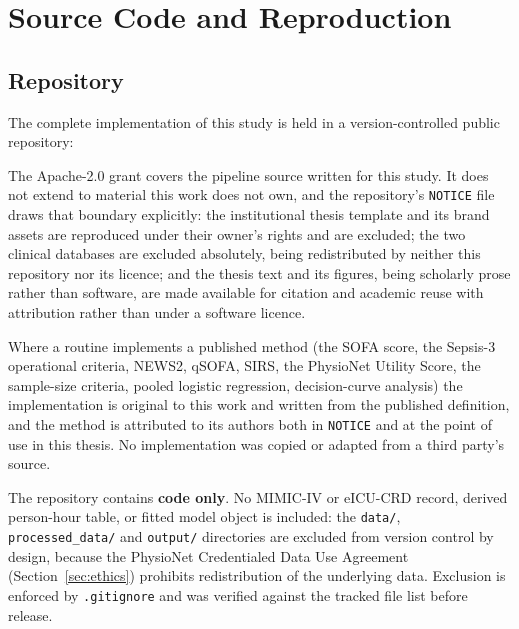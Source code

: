 \chapter{Source Code and Reproduction}
\label{app:code}

\section{Repository}
\label{app:repo}

The complete implementation of this study is held in a version-controlled
public repository:

\begin{center}
\end{center}

The Apache-2.0 grant covers the pipeline source written for this study. It does
not extend to material this work does not own, and the repository's
\texttt{NOTICE} file draws that boundary explicitly: the institutional thesis
template and its brand assets are reproduced under their owner's rights and are
excluded; the two clinical databases are excluded absolutely, being redistributed
by neither this repository nor its licence; and the thesis text and its figures,
being scholarly prose rather than software, are made available for citation and
academic reuse with attribution rather than under a software licence.

Where a routine implements a published method (the SOFA score, the Sepsis-3
operational criteria, NEWS2, qSOFA, SIRS, the PhysioNet Utility Score, the
sample-size criteria, pooled logistic regression, decision-curve analysis) the
implementation is original to this work and written from the published
definition, and the method is attributed to its authors both in \texttt{NOTICE}
and at the point of use in this thesis. No implementation was copied or adapted
from a third party's source.

The repository contains \textbf{code only}. No MIMIC-IV or eICU-CRD record,
derived person-hour table, or fitted model object is included: the
\texttt{data/}, \texttt{processed\_data/} and \texttt{output/} directories are
excluded from version control by design, because the PhysioNet Credentialed
Data Use Agreement (Section~\ref{sec:ethics}) prohibits redistribution of the
underlying data. Exclusion is enforced by \texttt{.gitignore} and was verified
against the tracked file list before release.

